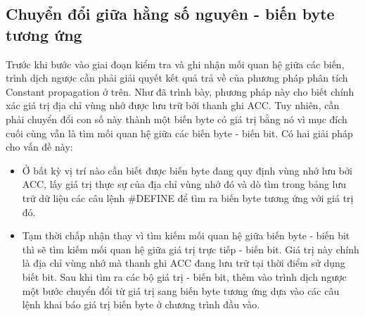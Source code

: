 \subsection{Chuyển đổi giữa hằng số nguyên - biến byte tương ứng}
\label{sec:transfer}
Trước khi bước vào giai đoạn kiểm tra và ghi nhận mối quan hệ giữa các biến, trình dịch ngược cần phải giải quyết kết quả trả về của phương pháp phân tích Constant propagation ở trên. Như đã trình bày, phương pháp này cho biết chính xác giá trị địa chỉ vùng nhớ được lưu trữ bởi thanh ghi ACC. Tuy nhiên, cần phải chuyển đổi con số này thành một biến byte có giá trị bằng nó vì mục đích cuối cùng vẫn là tìm mối quan hệ giữa các biến byte - biến bit. Có hai giải pháp cho vấn đề này:
\begin{itemize}
	\item Ở bất kỳ vị trí nào cần biết được biến byte đang quy định vùng nhớ lưu bởi ACC, lấy giá trị thực sự của địa chỉ vùng nhớ đó và dò tìm trong bảng lưu trữ dữ liệu các câu lệnh \#DEFINE để tìm ra biến byte tương ứng với giá trị đó.
	\item Tạm thời chấp nhận thay vì tìm kiếm mối quan hệ giữa biến byte - biến bit thì sẽ tìm kiếm mối quan hệ giữa giá trị trực tiếp - biến bit. Giá trị này chính là địa chỉ vùng nhớ mà thanh ghi ACC đang lưu trữ tại thời điểm sử dụng biết bit. Sau khi tìm ra các bộ giá trị - biến bit, thêm vào trình dịch ngược một bước chuyển đổi từ giá trị sang biến byte tương ứng dựa vào các câu lệnh khai báo giá trị biến byte ở chương trình đầu vào.
\end{itemize}

